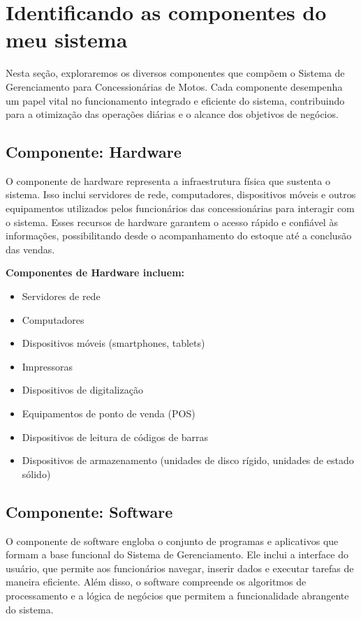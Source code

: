  \section{Identificando as componentes do meu sistema}

	Nesta seção, exploraremos os diversos componentes que compõem o Sistema de Gerenciamento para Concessionárias de Motos. Cada componente desempenha um papel vital no funcionamento integrado e eficiente do sistema, contribuindo para a otimização das operações diárias e o alcance dos objetivos de negócios.
     \subsection{Componente: Hardware}
	O componente de hardware representa a infraestrutura física que sustenta o sistema. Isso inclui servidores de rede, computadores, dispositivos móveis e outros equipamentos utilizados pelos funcionários das concessionárias para interagir com o sistema. Esses recursos de hardware garantem o acesso rápido e confiável às informações, possibilitando desde o acompanhamento do estoque até a conclusão das vendas.
	
	\textbf{Componentes de Hardware incluem:}
	
	\begin{itemize}
		\item Servidores de rede
		\item Computadores
		\item Dispositivos móveis (smartphones, tablets)
		\item Impressoras
		\item Dispositivos de digitalização
		\item Equipamentos de ponto de venda (POS)
		\item Dispositivos de leitura de códigos de barras
		\item Dispositivos de armazenamento (unidades de disco rígido, unidades de estado sólido)
	\end{itemize}
	
	
     \subsection{Componente: Software}
     
     O componente de software engloba o conjunto de programas e aplicativos que formam a base funcional do Sistema de Gerenciamento. Ele inclui a interface do usuário, que permite aos funcionários navegar, inserir dados e executar tarefas de maneira eficiente. Além disso, o software compreende os algoritmos de processamento e a lógica de negócios que permitem a funcionalidade abrangente do sistema.
     
